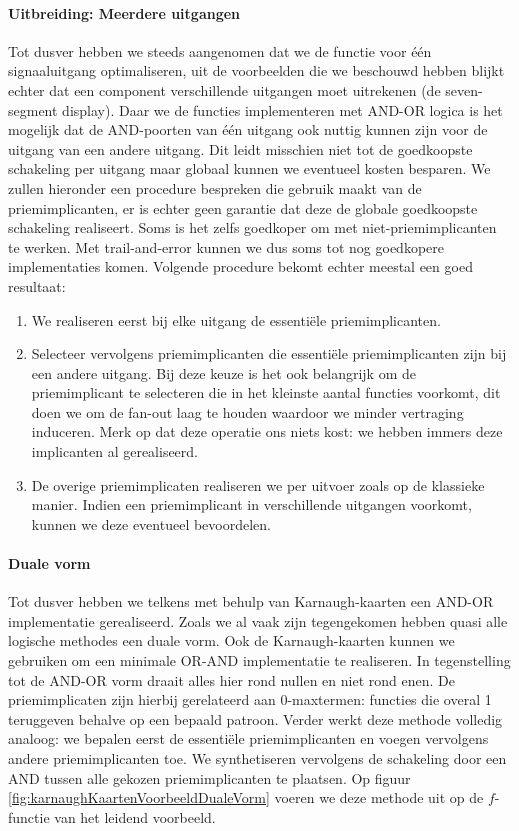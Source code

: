 \paragraph{Uitbreiding: Meerdere uitgangen}
Tot dusver hebben we steeds aangenomen dat we de functie voor \'e\'en signaaluitgang optimaliseren, uit de voorbeelden die we beschouwd hebben blijkt echter dat een component verschillende uitgangen moet uitrekenen (de seven-segment display). Daar we de functies implementeren met AND-OR logica is het mogelijk dat de AND-poorten van \'e\'en uitgang ook nuttig kunnen zijn voor de uitgang van een andere uitgang. Dit leidt misschien niet tot de goedkoopste schakeling per uitgang maar globaal kunnen we eventueel kosten besparen. We zullen hieronder een procedure bespreken die gebruik maakt van de priemimplicanten, er is echter geen garantie dat deze de globale goedkoopste schakeling realiseert. Soms is het zelfs goedkoper om met niet-priemimplicanten te werken. Met trail-and-error kunnen we dus soms tot nog goedkopere implementaties komen. Volgende procedure bekomt echter meestal een goed resultaat:
\begin{enumerate}
 \item We realiseren eerst bij elke uitgang de essenti\"ele priemimplicanten.
 \item Selecteer vervolgens priemimplicanten die essenti\"ele priemimplicanten zijn bij een andere uitgang. Bij deze keuze is het ook belangrijk om de priemimplicant te selecteren die in het kleinste aantal functies voorkomt, dit doen we om de fan-out laag te houden waardoor we minder vertraging induceren. Merk op dat deze operatie ons niets kost: we hebben immers deze implicanten al gerealiseerd.
 \item De overige priemimplicaten realiseren we per uitvoer zoals op de klassieke manier. Indien een priemimplicant in verschillende uitgangen voorkomt, kunnen we deze eventueel bevoordelen.
\end{enumerate}
\paragraph{Duale vorm}
Tot dusver hebben we telkens met behulp van Karnaugh-kaarten een AND-OR implementatie gerealiseerd. Zoals we al vaak zijn tegengekomen hebben quasi alle logische methodes een duale vorm. Ook de Karnaugh-kaarten kunnen we gebruiken om een minimale OR-AND implementatie te realiseren. In tegenstelling tot de AND-OR vorm draait alles hier rond nullen en niet rond enen. De priemimplicaten zijn hierbij gerelateerd aan 0-maxtermen: functies die overal 1 teruggeven behalve op een bepaald patroon. Verder werkt deze methode volledig analoog: we bepalen eerst de essenti\"ele priemimplicanten en voegen vervolgens andere priemimplicanten toe. We synthetiseren vervolgens de schakeling door een AND tussen alle gekozen priemimplicanten te plaatsen. Op figuur \ref{fig:karnaughKaartenVoorbeeldDualeVorm} voeren we deze methode uit op de $f$-functie van het leidend voorbeeld.
